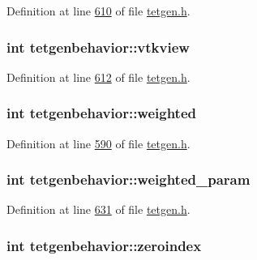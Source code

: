 Definition at line \hyperlink{tetgen_8h_source_l00610}{610} of file \hyperlink{tetgen_8h_source}{tetgen.\+h}.

\subsubsection[{\texorpdfstring{vtkview}{vtkview}}]{\setlength{\rightskip}{0pt plus 5cm}int tetgenbehavior\+::vtkview}\hypertarget{classtetgenbehavior_a8d7ada13e9df46a4ccb860de0d5bd978}{}\label{classtetgenbehavior_a8d7ada13e9df46a4ccb860de0d5bd978}


Definition at line \hyperlink{tetgen_8h_source_l00612}{612} of file \hyperlink{tetgen_8h_source}{tetgen.\+h}.

\subsubsection[{\texorpdfstring{weighted}{weighted}}]{\setlength{\rightskip}{0pt plus 5cm}int tetgenbehavior\+::weighted}\hypertarget{classtetgenbehavior_a6ad479e03a42fab8c5f6e4d6adb1be47}{}\label{classtetgenbehavior_a6ad479e03a42fab8c5f6e4d6adb1be47}


Definition at line \hyperlink{tetgen_8h_source_l00590}{590} of file \hyperlink{tetgen_8h_source}{tetgen.\+h}.

\subsubsection[{\texorpdfstring{weighted\+\_\+param}{weighted_param}}]{\setlength{\rightskip}{0pt plus 5cm}int tetgenbehavior\+::weighted\+\_\+param}\hypertarget{classtetgenbehavior_af7f32fedb214eab9b328974e2b564437}{}\label{classtetgenbehavior_af7f32fedb214eab9b328974e2b564437}


Definition at line \hyperlink{tetgen_8h_source_l00631}{631} of file \hyperlink{tetgen_8h_source}{tetgen.\+h}.

\subsubsection[{\texorpdfstring{zeroindex}{zeroindex}}]{\setlength{\rightskip}{0pt plus 5cm}int tetgenbehavior\+::zeroindex}\hypertarget{classtetgenbehavior_a8fdd3e7c5d8ac46e72071888e6890eeb}{}\label{classtetgenbehavior_a8fdd3e7c5d8ac46e72071888e6890eeb}


